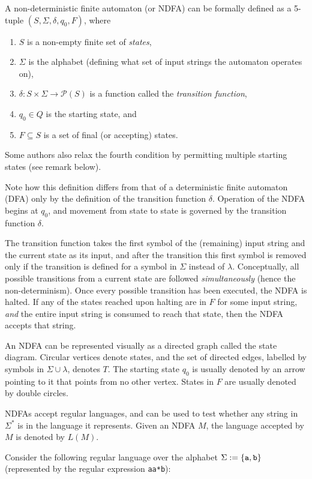 \documentclass[12pt]{article}
\begin{document}
A non-deterministic finite automaton (or NDFA) can be formally defined as a 5-tuple $(S, \Sigma, \delta, q_0, F)$, where 
\begin{enumerate}
\item $S$ is a non-empty finite set of \emph{states},
\item $\Sigma$ is the alphabet (defining what set of input strings the automaton operates on), 
\item $\delta : S\times \Sigma \rightarrow\mathcal{P}(S)$ is a function called the \emph{transition function}, 
\item $q_0\in Q$ is the starting state, and 
\item $F\subseteq S$ is a set of final (or accepting) states.  
\end{enumerate}
Some authors also relax the fourth condition by permitting multiple starting states (see remark below).

Note how this definition differs from that of a deterministic finite automaton (DFA) only by the definition of the transition function $\delta$.  Operation of the NDFA begins at $q_0$, and movement from state to state is governed by the transition function $\delta$.

The transition function takes the first symbol of the (remaining) input string and the current state as its input, and after the transition this first symbol is removed only if the transition is defined for a symbol in $\Sigma$ instead of $\lambda$.  Conceptually, all possible transitions from a current state are followed \emph{simultaneously} (hence the non-determinism).  Once every possible transition has been executed, the NDFA is halted.   If any of the states reached upon halting are in $F$ for some input string, \emph{and} the entire input string is consumed to reach that state, then the NDFA accepts that string.

An NDFA can be represented visually as a directed graph called the state diagram.  Circular vertices denote states, and the set of directed edges, labelled by symbols in $\Sigma\cup\lambda$, denotes $T$.  The starting state $q_0$ is usually denoted by an arrow pointing to it that points from no other vertex. States in $F$ are usually denoted by double circles.

NDFAs accept regular languages, and can be used to test whether any string in $\Sigma^*$ is in the language it represents.  Given an NDFA $M$, the language accepted by $M$ is denoted by $L(M)$.

Consider the following regular language over the alphabet $\Sigma := \left\{ \verb*.a., \verb*.b. \right\}$ (represented by the regular expression \verb=aa*b=):
\end{document}
